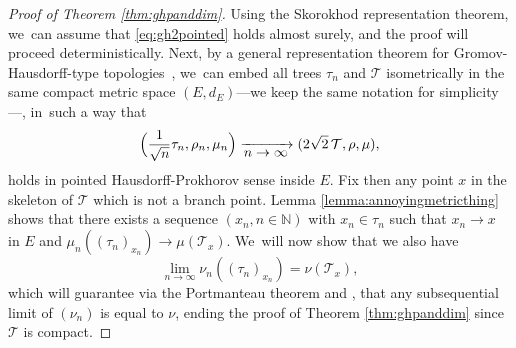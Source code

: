 \documentclass[JEP,XML,SOM,Unicode,NoFloatCountersInSection, NoEqCountersInSection,published]{cedram}
\newcommand{\N}{\mathbb{N}}
\newcommand{\T}{\mathcal{T}}\let\CRT\T\let\tbr\T
\theoremstyle{definition}
\begin{document}
\begin{proof}[Proof of Theorem \ref{thm:ghpanddim}]
Using the Skorokhod representation theorem, we~can assume that \eqref{eq:gh2pointed} holds almost surely, and the proof will proceed deterministically. Next, by a general representation theorem for Gromov-Hausdorff-type topologies~\cite[Lem.\,2.5]{khezeli2023unified}, we~can
embed all trees $\tau_n$ and $ \mathcal{T}$ isometrically in the same compact
metric space $(E,d_E)$---we keep the same notation for simplicity---, in~such a way that
\begin{equation*}
\Bigl(\frac{1}{\sqrt{n}} \tau_n,\rho_n,\mu_n\Bigr) \xrightarrow[\textstyle n\to\infty]{} (2\sqrt{2}\,\T,\rho,\mu),
\end{equation*}
holds in pointed Hausdorff-Prokhorov sense inside $E$. Fix then any point $x$ in the skeleton of $\T$ which is not a branch point. Lemma \ref{lemma:annoyingmetricthing} shows that there exists a sequence $(x_n,n\in\N)$ with $x_n\in\tau_n$ such that $x_n \to x$ in $E$ and $\mu_n((\tau_n)_{x_n}) \to \mu(\T_x)$. We~will now show that we also have
\begin{equation}\label{eq:GHPlimofnu} \lim_{n \to \infty} \nu_n((\tau_n)_{x_n})= \nu(\T_x),\end{equation}
which will guarantee via the Portmanteau theorem and \cite[Prop.\,1]{Steph13}, that any subsequential limit of $(\nu_n)$ is equal to $\nu$, ending the proof of Theorem \ref{thm:ghpanddim} since $ \mathcal{T}$ is compact.


\end{proof}
\end{document}
